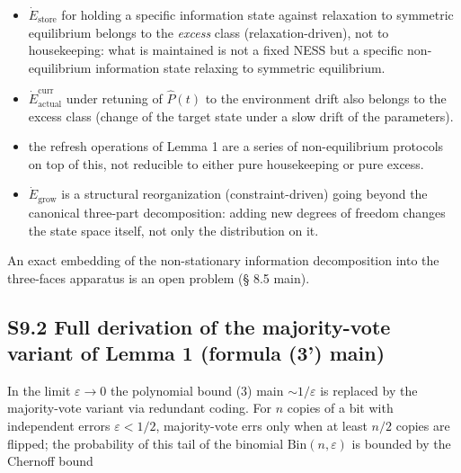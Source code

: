 \documentclass[pdflatex,sn-mathphys-ay]{sn-jnl}
\providecommand{\tightlist}{\setlength{\itemsep}{0pt}\setlength{\parskip}{0pt}}
\begin{document}
\begin{itemize}

\tightlist

\item

  \(\dot{E}_{\text{store}}\) for holding a specific information state against relaxation to symmetric equilibrium belongs to the \emph{excess} class (relaxation-driven), not to housekeeping: what is maintained is not a fixed NESS but a specific non-equilibrium information state relaxing to symmetric equilibrium.

\item

  \(\dot{E}_{\text{actual}}^{\text{curr}}\) under retuning of \(\hat P(t)\) to the environment drift also belongs to the excess class (change of the target state under a slow drift of the parameters).

\item

  the refresh operations of Lemma 1 are a series of non-equilibrium protocols on top of this, not reducible to either pure housekeeping or pure excess.

\item

  \(\dot{E}_{\text{grow}}\) is a structural reorganization (constraint-driven) going beyond the canonical three-part decomposition: adding new degrees of freedom changes the state space itself, not only the distribution on it.

\end{itemize}



An exact embedding of the non-stationary information decomposition into the three-faces apparatus is an open problem (§ 8.5 main).



\subsection*{S9.2 Full derivation of the majority-vote variant of Lemma 1 (formula (3') main)}\label{s9.2-full-derivation-of-the-majority-vote-variant-of-lemma-1-formula-3-main}



In the limit \(\varepsilon \to 0\) the polynomial bound (3) main \(\sim 1/\varepsilon\) is replaced by the majority-vote variant via redundant coding. For \(n\) copies of a bit with independent errors \(\varepsilon < 1/2\), majority-vote errs only when at least \(n/2\) copies are flipped; the probability of this tail of the binomial \(\mathrm{Bin}(n,\varepsilon)\) is bounded by the Chernoff bound
\end{document}
